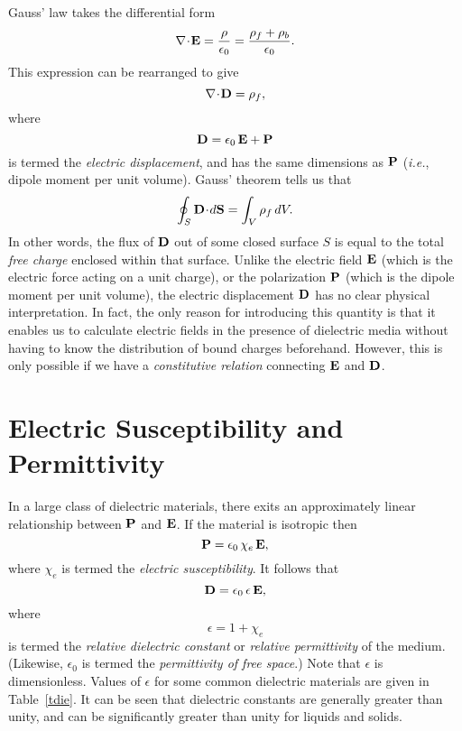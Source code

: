 Gauss' law takes the differential form
\begin{equation}
\nabla\!\cdot\!{\bf E} = \frac{\rho}{\epsilon_0} =
\frac{\rho_f + \rho_b}{\epsilon_0}.
\end{equation}
This expression can be rearranged to give
\begin{equation}\label{e6.5}
\nabla\!\cdot\!{\bf D} = \rho_f,
\end{equation}
where
\begin{equation}\label{e6.6}
{\bf D} = \epsilon_0 \,{\bf E} + {\bf P}
\end{equation}
is termed the {\em electric displacement}, and has the same dimensions
as ${\bf P}$ ({\em i.e.}, dipole moment
per unit volume). Gauss' theorem tells us that
\begin{equation}\label{e6.7}
\oint_S {\bf D}\!\cdot\!d{\bf S} = \int_V \rho_f\,dV.
\end{equation}
In other words, the flux of ${\bf D}$ out of some closed surface $S$
is equal to the total {\em free charge}\/ enclosed within that surface. Unlike the
electric field ${\bf E}$ (which is the electric force acting on a unit charge),
or the polarization ${\bf P}$ (which is the dipole moment per unit volume),
the electric displacement ${\bf D}$ has no clear physical interpretation. 
In fact, the only reason for introducing this quantity is that it enables us to
calculate electric fields in the presence of dielectric media  without 
having to know the distribution of bound charges beforehand. However,
this is only possible if we have a {\em constitutive
relation}\/ connecting  ${\bf E}$ and  ${\bf D}$.

\section{Electric Susceptibility and Permittivity}
In a large class of dielectric materials, there exits an approximately
 linear relationship between ${\bf P}$ and ${\bf E}$. If the material
 is isotropic then
\begin{equation}\label{e6.8}
{\bf P} = \epsilon_0\,\chi_e  \,{\bf E},
\end{equation}
where $\chi_e$ is termed the {\em electric susceptibility}. It follows that
\begin{equation}\label{e6.9}
{\bf D} = \epsilon_0\,\epsilon\,{\bf E},
\end{equation}
where
\begin{equation}\label{e6.10}
\epsilon= 1 + \chi_e
\end{equation}
is termed the {\em relative dielectric constant}\/ or
 {\em relative permittivity}\/ of the medium. 
(Likewise, $\epsilon_0$ is termed the {\em permittivity of free space}.)
Note that $\epsilon$ is dimensionless. Values of $\epsilon$ for some
common dielectric materials are given in Table~\ref{tdie}. It can be seen
that dielectric constants are generally greater than unity, and can be significantly greater than unity for liquids and solids.

